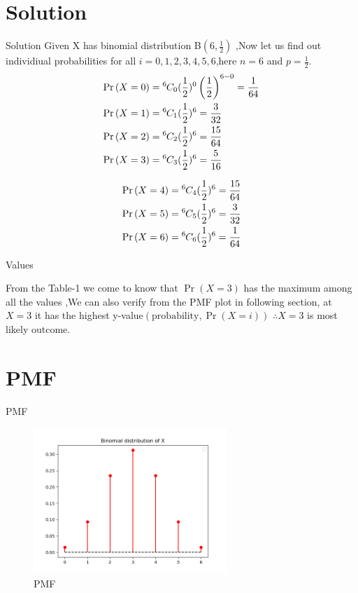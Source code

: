 \documentclass{beamer}
\providecommand{\pr}[1]{\ensuremath{\Pr\left(#1\right)}}
\providecommand{\brak}[1]{\ensuremath{\left(#1\right)}}
\newcommand*{\permcomb}[4][0mu]{{{}^{#3}\mkern#1#2_{#4}}}
\newcommand*{\comb}[1][-1mu]{\permcomb[#1]{C}}
\begin{document}
	\section{Solution}	
	\begin{frame}{Solution}
		Given X has binomial distribution B\brak{6,\frac{1}{2}} ,Now let us find out individiual probabilities for all $i=0,1,2,3,4,5,6$,here $n=6$ and $p=\frac{1}{2}$.
		\begin{align}
		\pr{X = 0} &=\comb{6}{0}(\frac{1}{2})^0\left(\frac{1}{2}\right)^{6-0}=\frac{1}{64} \\
			\pr{X = 1}& =\comb{6}{1}(\frac{1}{2})^6=\frac{3}{32}\\
			\pr{X = 2} &=\comb{6}{2}(\frac{1}{2})^6=\frac{15}{64}\\
			\pr{X = 3} &=\comb{6}{3}(\frac{1}{2})^6=\frac{5}{16}
		\end{align}
	\end{frame}

	\begin{frame}{}
	\begin{align}
	\pr{X = 4} &=\comb{6}{4}(\frac{1}{2})^6=\frac{15}{64}\\
			\pr{X = 5} &=\comb{6}{5}(\frac{1}{2})^6=\frac{3}{32}\\
			\pr{X = 6} &=\comb{6}{6}(\frac{1}{2})^6=\frac{1}{64}
	\end{align}
		\begin{table}[ht!]
	\centering
	
	\caption{Values}
	\label{table:1}
    \end{table}
	\end{frame}

\begin{frame}{}
From the Table-1 we come to know that $\pr{X=3}$ has the maximum among all the values ,We can also verify from the PMF plot in following section, at $X=3$ it has the highest y-value\brak{\text{probability},\pr{X=i}}
$\therefore X=3$ is most likely outcome.

\end{frame}
\section{PMF}
\begin{frame}{PMF}
\begin{figure}[!ht]
		\centering
			\includegraphics[width=\textwidth,height=5.5cm,keepaspectratio]{figs/binomial1.png}
		\caption{PMF}
		\label{Fig 0:}
	\end{figure}
\end{frame}
\end{document}
